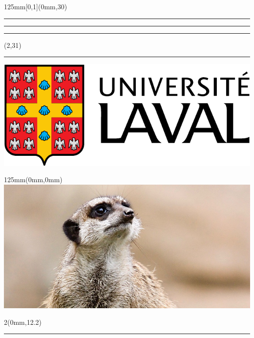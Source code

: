 \begin{frame}[plain]
  \begin{textblock*}{125mm}[0,1](0mm,30\TPVertModule)
    \textcolor{rouge}{\rule{\banderougewidth}{\banderougeheight}}%
    \rule{\gapwidth}{0pt}%
    \textcolor{or}{\rule{\bandeorwidth}{\bandeorheight}}           %
  \end{textblock*}

  \begin{textblock*}{\TPHorizModule}(2\TPHorizModule,31\TPVertModule)
    \rule{\gapwidth}{0pt}%
    \includegraphics[height=\logoheight,keepaspectratio=true]{ul_p}
  \end{textblock*}

  \begin{textblock*}{125mm}(0mm,0mm)
    \includegraphics[width=\imagewidth,%
                     keepaspectratio=true]{Suricata-diapos.jpg}
  \end{textblock*}

  \begin{textblock*}{2\TPHorizModule}(0mm,12.2\TPVertModule)
    \textcolor{white}{\rule{\linewidth}{11\TPVertModule}}
  \end{textblock*}


\end{frame}
